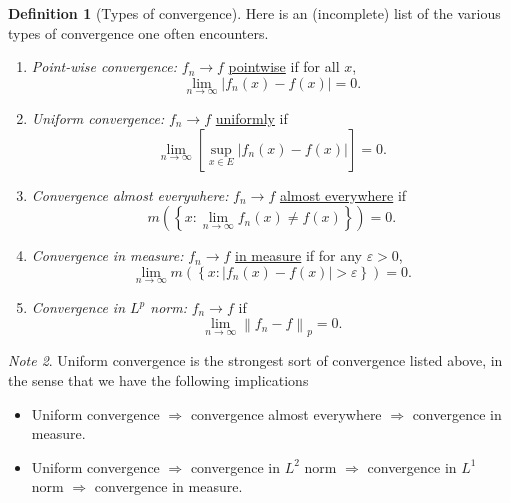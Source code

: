 \documentclass[a4paper,12pt]{scrreprt}
\newcommand{\defn}[1]{\ul{#1}}
\newcommand{\norm}[1]{\left\|#1\right\|}
\theoremstyle{definition}
\newtheorem{definition}{Definition}
\theoremstyle{plain}
\theoremstyle{remark}
\newtheorem{note}[definition]{Note}
\begin{document}
\begin{definition}[Types of convergence]
  \label{def:typesofconvergence}
  Here is an (incomplete) list of the various types of convergence one often encounters.
  \begin{enumerate}
    \item \emph{Point-wise convergence:} $f_{n} \to f$ \defn{pointwise} if for all $x$,
      \begin{equation*}
        \lim_{n \to \infty} \left|f_{n}(x) - f(x) \right| = 0.
      \end{equation*}

    \item \emph{Uniform convergence:} $f_{n} \to f$ \defn{uniformly} if
      \begin{equation*}
        \lim_{n \to \infty} \left[ \sup_{x \in E} \left| f_{n}(x) - f(x) \right| \right] = 0.
      \end{equation*}

    \item \emph{Convergence almost everywhere:} $f_{n} \to f$ \defn{almost everywhere} if
      \begin{equation*}
        m\left( \left\{ x\colon \lim_{n \to \infty} f_{n}(x) \neq f(x)  \right\} \right) = 0.
      \end{equation*}

    \item \emph{Convergence in measure:} $f_{n} \to f$ \defn{in measure} if for any $\varepsilon > 0$,
      \begin{equation*}
        \lim_{n \to \infty} m\left( \left\{ x\colon \left|f_{n}(x) - f(x) \right| > \varepsilon \right\} \right) = 0.
      \end{equation*}

    \item \emph{Convergence in $L^{p}$ norm:} $f_{n} \to f$ if
      \begin{equation*}
        \lim_{n \to \infty} \norm{f_{n} - f}_{p} = 0.
      \end{equation*}
  \end{enumerate}
\end{definition}

\begin{note}
  Uniform convergence is the strongest sort of convergence listed above, in the sense that we have the following implications
  \begin{itemize}
    \item Uniform convergence $\Rightarrow$ convergence almost everywhere $\Rightarrow$ convergence in measure.

    \item Uniform convergence $\Rightarrow$ convergence in $L^{2}$ norm $\Rightarrow$ convergence in $L^{1}$ norm $\Rightarrow$ convergence in measure.
  \end{itemize}
\end{note}
\end{document}
